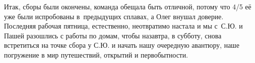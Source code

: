Итак, сборы были окончены, команда обещала быть отличной, потому что 4/5 её уже были испробованы в~предыдущих сплавах, а Олег внушал доверие. Последняя рабочая пятница, естественно, неотвратимо настала и мы с~С.Ю. и Пашей разошлись с работы по домам, чтобы назавтра, в субботу, снова встретиться на точке сбора у С.Ю. и начать нашу очередную авантюру, наше погружение в мир путешествий, открытий и первобытности.

\begin{center}
\end{center}
